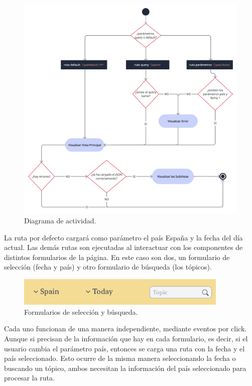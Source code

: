 \begin{figure}[H]
    \centering
    \myfloatalign
    \includegraphics[width=1.001\textwidth]{gfx/Diagrama-actividad.png}
    \caption[Diagrama de actividad]{Diagrama de actividad.}\label{gfx:Diagrama-actividad}
\end{figure}

La ruta por defecto cargará como parámetro el país España y la fecha del día actual. Las demás rutas son ejecutadas al interactuar con los componentes de distintos formularios de la página. En este caso son dos, un formulario de selección (fecha y país) y otro formulario de búsqueda (los tópicos).

\vspace{0.3cm}

\begin{figure}[H]
    \centering
    \myfloatalign
    \includegraphics[width=0.9\textwidth]{gfx/Formularios.png}
    \caption[Formularios de selección y búsqueda]{Formularios de selección y búsqueda.}\label{gfx:Formularios}
\end{figure}

Cada uno funcionan de una manera independiente, mediante eventos por click. Aunque si precisan de la información que hay en cada formulario, es decir, si el usuario cambia el parámetro país, entonces se carga una ruta con la fecha y el país seleccionado. Esto ocurre de la misma manera seleccionando la fecha o buscando un tópico, ambos necesitan la información del país seleccionado para procesar la ruta.

